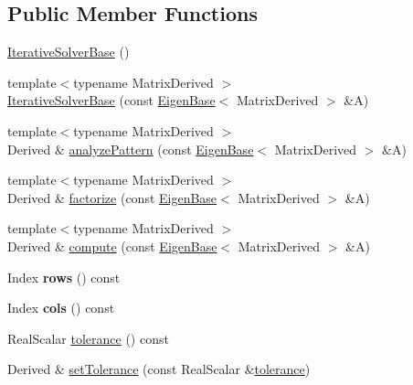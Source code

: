 \subsection*{Public Member Functions}
\begin{DoxyCompactItemize}
\item 
\mbox{\hyperlink{class_eigen_1_1_iterative_solver_base_a0922f2be45082690d7734aa6732fc493}{Iterative\+Solver\+Base}} ()
\item 
{\footnotesize template$<$typename Matrix\+Derived $>$ }\\\mbox{\hyperlink{class_eigen_1_1_iterative_solver_base_a3c68fe3cd929ea1ff8a0d4cbcd65ebad}{Iterative\+Solver\+Base}} (const \mbox{\hyperlink{struct_eigen_1_1_eigen_base}{Eigen\+Base}}$<$ Matrix\+Derived $>$ \&A)
\item 
{\footnotesize template$<$typename Matrix\+Derived $>$ }\\Derived \& \mbox{\hyperlink{class_eigen_1_1_iterative_solver_base_a3f684fb41019ca04d97ddc08a0d8be2e}{analyze\+Pattern}} (const \mbox{\hyperlink{struct_eigen_1_1_eigen_base}{Eigen\+Base}}$<$ Matrix\+Derived $>$ \&A)
\item 
{\footnotesize template$<$typename Matrix\+Derived $>$ }\\Derived \& \mbox{\hyperlink{class_eigen_1_1_iterative_solver_base_a1374b141721629983cd8276b4b87fc58}{factorize}} (const \mbox{\hyperlink{struct_eigen_1_1_eigen_base}{Eigen\+Base}}$<$ Matrix\+Derived $>$ \&A)
\item 
{\footnotesize template$<$typename Matrix\+Derived $>$ }\\Derived \& \mbox{\hyperlink{class_eigen_1_1_iterative_solver_base_a7dfa55c55e82d697bde227696a630914}{compute}} (const \mbox{\hyperlink{struct_eigen_1_1_eigen_base}{Eigen\+Base}}$<$ Matrix\+Derived $>$ \&A)
\item 
\mbox{\label{class_eigen_1_1_iterative_solver_base_a51213f927ba8c833807544bf5e58c8b9}} 
Index {\bfseries rows} () const
\item 
\mbox{\label{class_eigen_1_1_iterative_solver_base_a0f6ceadc947fcbe32a3c68060e2ce6be}} 
Index {\bfseries cols} () const
\item 
Real\+Scalar \mbox{\hyperlink{class_eigen_1_1_iterative_solver_base_acb442c19b5858d6b9be813dd7d36cc62}{tolerance}} () const
\item 
Derived \& \mbox{\hyperlink{class_eigen_1_1_iterative_solver_base_ac160a444af8998f93da9aa30e858470d}{set\+Tolerance}} (const Real\+Scalar \&\mbox{\hyperlink{class_eigen_1_1_iterative_solver_base_acb442c19b5858d6b9be813dd7d36cc62}{tolerance}})

\end{DoxyCompactItemize}
